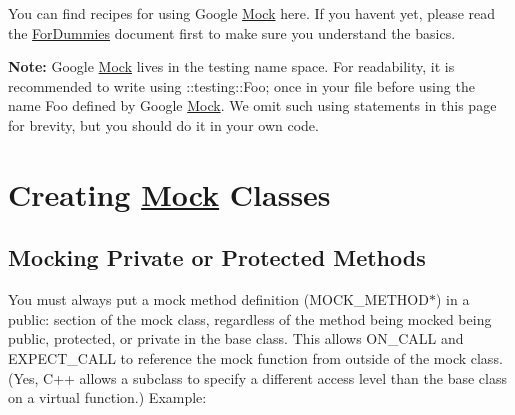 You can find recipes for using Google \mbox{\hyperlink{class_mock}{Mock}} here. If you haven\textquotesingle{}t yet, please read the \mbox{\hyperlink{_obj__test_2lib_2googletest-release-1_88_81_2googlemock_2docs_2_for_dummies_8md}{For\+Dummies}} document first to make sure you understand the basics.

{\bfseries{Note\+:}} Google \mbox{\hyperlink{class_mock}{Mock}} lives in the {\ttfamily testing} name space. For readability, it is recommended to write {\ttfamily using \+::testing\+::\+Foo;} once in your file before using the name {\ttfamily Foo} defined by Google \mbox{\hyperlink{class_mock}{Mock}}. We omit such {\ttfamily using} statements in this page for brevity, but you should do it in your own code.

\section*{Creating \mbox{\hyperlink{class_mock}{Mock}} Classes}

\subsection*{Mocking Private or Protected Methods}

You must always put a mock method definition ({\ttfamily M\+O\+C\+K\+\_\+\+M\+E\+T\+H\+O\+D$\ast$}) in a {\ttfamily public\+:} section of the mock class, regardless of the method being mocked being {\ttfamily public}, {\ttfamily protected}, or {\ttfamily private} in the base class. This allows {\ttfamily O\+N\+\_\+\+C\+A\+LL} and {\ttfamily E\+X\+P\+E\+C\+T\+\_\+\+C\+A\+LL} to reference the mock function from outside of the mock class. (Yes, C++ allows a subclass to specify a different access level than the base class on a virtual function.) Example\+:


